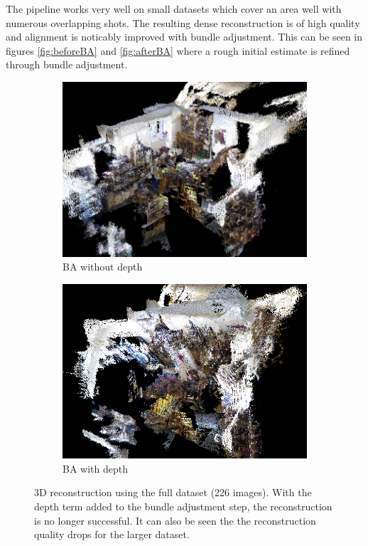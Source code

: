 \documentclass[10pt,twocolumn,letterpaper]{article}
\begin{document}
The pipeline works very well on small datasets which cover an area well with
numerous overlapping shots. The resulting dense reconstruction is of high
quality and alignment is noticably improved with bundle adjustment. This can be
seen in figures \ref{fig:beforeBA} and \ref{fig:afterBA} where a rough initial
estimate is refined through bundle adjustment.

\begin{figure}
\centering

   \begin{subfigure}[b]{1.0\columnwidth}
   \includegraphics[width=\textwidth]{figures/result_large_BA_noD.png}
   \caption{BA without depth}
   \label{fig:BA_noD}
   \end{subfigure}
   \hfill
   \begin{subfigure}[b]{1.0\columnwidth}
   \includegraphics[width=\textwidth]{figures/result_large_BA_D.png}
   \caption{BA with depth}
   \label{fig:BA_withD}
   \end{subfigure}

\caption{3D reconstruction using the full dataset (226 images). With the depth
term added to the bundle adjustment step, the reconstruction is no longer
successful. It can also be seen the the reconstruction quality drops for the
larger dataset.}
\label{fig:3Dlarge}
\end{figure}
\end{document}

